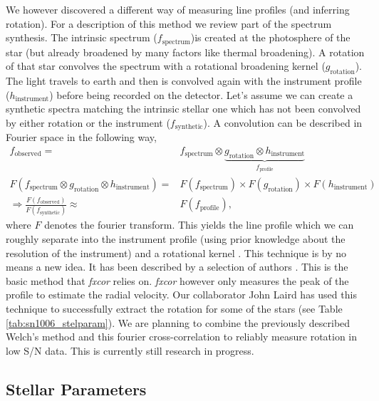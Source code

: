 We however discovered a different way of measuring line profiles (and inferring rotation). For a description of this method we review part of the spectrum synthesis. The intrinsic spectrum ($f_\textrm{spectrum}$)is created at the photosphere of the star (but already broadened by many factors like thermal broadening). A rotation of that star convolves the spectrum with a rotational broadening kernel ($g_\textrm{rotation}$). The light travels to earth and then is convolved again with the instrument profile ($h_\textrm{instrument}$) before being recorded on the detector.  Let's assume we can create a synthetic spectra matching the intrinsic stellar one which has not been convolved by either rotation or the instrument ($f_\textrm{synthetic}$). A convolution can be described in Fourier space in the following way,
\begin{align*}
	f_\textrm{observed} =& f_\textrm{spectrum} \otimes \underbrace{g_\textrm{rotation} \otimes h_\textrm{instrument}}_{f_\textrm{profile}}\\
     F(f_\textrm{spectrum} \otimes g_\textrm{rotation} \otimes h_\textrm{instrument}) =& F(f_\textrm{spectrum}) \times F(g_\textrm{rotation}) \times F(h_\textrm{instrument})\\
     \Rightarrow \frac{F(f_\textrm{observed})}{F(f_\textrm{synthetic})} \approx& F(f_\textrm{profile}),
\end{align*}
where $F$ denotes the fourier transform. This yields the line profile which we can roughly separate into the instrument profile (using prior knowledge about the resolution of the instrument) and a rotational kernel . This technique is by no means a new idea. It has been described by a selection of authors \citep[e.g.][]{1977ApJ...211..198G}. This is the basic method that \textit{fxcor} relies on. \textit{fxcor} however only measures the peak of the profile to estimate the radial velocity. Our collaborator John Laird has used this technique to successfully extract the rotation for some of the stars (see Table \ref{tab:sn1006_stelparam}). We are planning to combine the previously described Welch's method and this fourier cross-correlation to reliably measure rotation in low S/N data. This is currently still research in progress.

\subsection{Stellar Parameters}
\label{sec:sn1006_stelparam}


